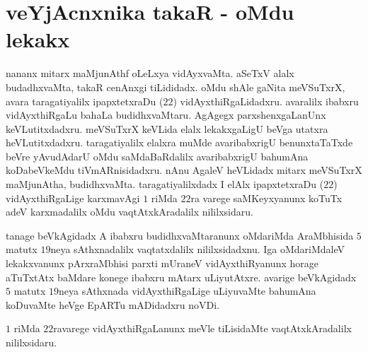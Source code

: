 \chapter{veYjAcnxnika takaR - oMdu lekakx}

nananx mitarx maMjunAthf oLeLxya vidAyxvaMta. aSeTxV alalx budadhxvaMta, takaR cenAnxgi tiLididadx. oMdu shAle gaNita meVSuTxrX, avara taragatiyalilx ipapxtetxraDu ($22$) vidAyxthiRgaLidadxru. avaralilx ibabxru vidAyxthiRgaLu bahaLa budidhxvaMtaru. AgAgegx parxshenxgaLanUnx keVLutitxdadxru. meVSuTxrX keVLida elalx lekakxgaLigU beVga utatxra heVLutitxdadxru. taragatiyalilx elalxra muMde avaribabxrigU benunxtaTaTxde beVre yAvudAdarU oMdu saMdaBaRdalilx avaribabxrigU bahumAna koDabeVkeMdu tiVmARnisidadxru. nAnu AgaleV heVLidadx mitarx meVSuTxrX maMjunAtha, budidhxvaMta. taragatiyalilxdadx I elAlx ipapxtetxraDu ($22$) vidAyxthiRgaLige karxmavAgi $1$ riMda $22$ra varege saMKeyxyanunx koTuTx adeV karxmadalilx oMdu vaqtAtxkAradalilx nililxsidaru.

tanage beVkAgidadx A ibabxru budidhxvaMtaranunx oMdariMda AraMbhisida $5$ matutx $19$neya sAthxnadalilx vaqtatxdalilx nililxsidadxnu. Iga oMdariMdaleV lekakxvanunx pArxraMbhisi parxti mUraneV vidAyxthiRyanunx horage aTuTxtAtx baMdare konege ibabxru mAtarx uLiyutAtxre. avarige beVkAgidadx $5$ matutx $19$neya sAthxnada vidAyxthiRgaLige uLiyuvaMte bahumAna koDuvaMte heVge EpARTu mADidadxru noVDi.

$1$ riMda $22$ravarege vidAyxthiRgaLanunx meVle tiLisidaMte vaqtAtxkAradalilx nililxsidaru.



